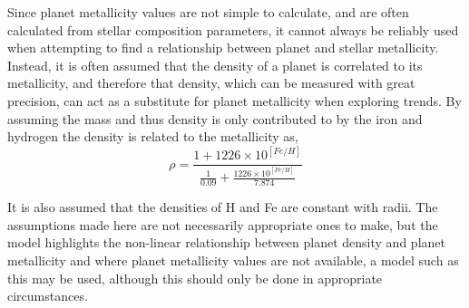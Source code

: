 \documentclass[a4paper,twocolumn,12pt]{article}
\begin{document}






Since planet metallicity values are not simple to calculate, and are often calculated from stellar composition parameters, it cannot always be reliably used when attempting to find a relationship between planet and stellar metallicity. Instead, it is often assumed that the density of a planet is correlated to its metallicity, and therefore that density, which can be measured with great precision, can act as a substitute for planet metallicity when exploring trends. By assuming the mass and thus density is only contributed to by the iron and hydrogen the density is related to the metallicity as,
\begin{equation}
\rho = \frac{1 + 1226\times10^{[Fe/H]}}{\frac{1}{0.09}+\frac{1226\times10^{[Fe/H]}}{7.874}}
\label{equation1}
\end{equation}

It is also assumed that the densities of H and Fe are constant with radii. The assumptions made here are not necessarily appropriate ones to make, but the model highlights the non-linear relationship between planet density and planet metallicity and where planet metallicity values are not available, a model such as this may be used, although this should only be done in appropriate circumstances.
\end{document}
